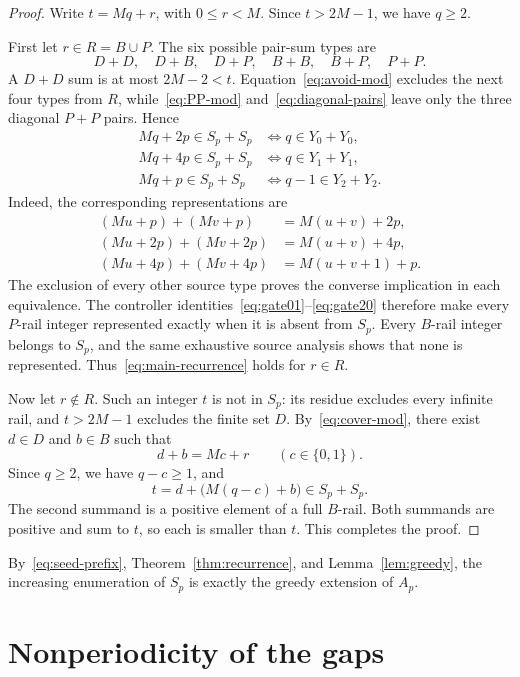 \documentclass[11pt,letterpaper]{article}
\begin{document}
\begin{proof}
Write \(t=Mq+r\), with \(0\leq r<M\). Since \(t>2M-1\), we have \(q\geq2\).

First let \(r\in R=B\cup P\). The six possible pair-sum types are
\[
D+D,\quad D+B,\quad D+P,\quad B+B,\quad B+P,\quad P+P.
\]
A \(D+D\) sum is at most \(2M-2<t\). Equation~\eqref{eq:avoid-mod} excludes the next four types from \(R\), while~\eqref{eq:PP-mod} and~\eqref{eq:diagonal-pairs} leave only the three diagonal \(P+P\) pairs. Hence
\begin{align*}
Mq+2p\in S_p+S_p&\iff q\in Y_0+Y_0,\\
Mq+4p\in S_p+S_p&\iff q\in Y_1+Y_1,\\
Mq+p\in S_p+S_p&\iff q-1\in Y_2+Y_2.
\end{align*}
Indeed, the corresponding representations are
\begin{align*}
(Mu+p)+(Mv+p)&=M(u+v)+2p,\\
(Mu+2p)+(Mv+2p)&=M(u+v)+4p,\\
(Mu+4p)+(Mv+4p)&=M(u+v+1)+p.
\end{align*}
The exclusion of every other source type proves the converse implication in each equivalence. The controller identities~\eqref{eq:gate01}--\eqref{eq:gate20} therefore make every \(P\)-rail integer represented exactly when it is absent from \(S_p\). Every \(B\)-rail integer belongs to \(S_p\), and the same exhaustive source analysis shows that none is represented. Thus~\eqref{eq:main-recurrence} holds for \(r\in R\).

Now let \(r\notin R\). Such an integer \(t\) is not in \(S_p\): its residue excludes every infinite rail, and \(t>2M-1\) excludes the finite set \(D\). By~\eqref{eq:cover-mod}, there exist \(d\in D\) and \(b\in B\) such that
\[
d+b=Mc+r
\qquad(c\in\{0,1\}).
\]
Since \(q\geq2\), we have \(q-c\geq1\), and
\[
t=d+\bigl(M(q-c)+b\bigr)\in S_p+S_p.
\]
The second summand is a positive element of a full \(B\)-rail. Both summands are positive and sum to \(t\), so each is smaller than \(t\). This completes the proof.
\end{proof}

By~\eqref{eq:seed-prefix}, Theorem~\ref{thm:recurrence}, and Lemma~\ref{lem:greedy}, the increasing enumeration of \(S_p\) is exactly the greedy extension of \(A_p\).

\section{Nonperiodicity of the gaps}
\end{document}
